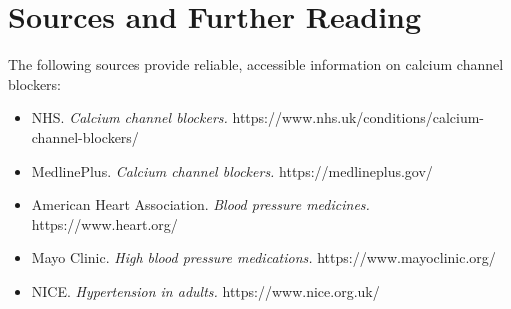 \section*{Sources and Further Reading}
The following sources provide reliable, accessible information on calcium channel blockers:
\begin{itemize}
    \item NHS. \textit{Calcium channel blockers.} https://www.nhs.uk/conditions/calcium-channel-blockers/
    \item MedlinePlus. \textit{Calcium channel blockers.} https://medlineplus.gov/
    \item American Heart Association. \textit{Blood pressure medicines.} https://www.heart.org/
    \item Mayo Clinic. \textit{High blood pressure medications.} https://www.mayoclinic.org/
    \item NICE. \textit{Hypertension in adults.} https://www.nice.org.uk/
\end{itemize}

